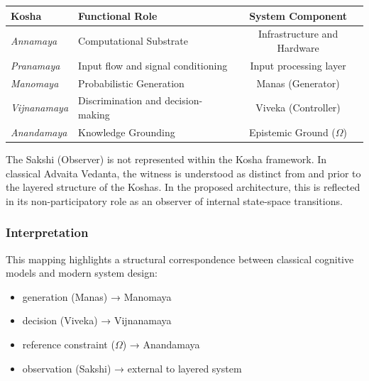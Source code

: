 \documentclass[12pt,a4paper]{article}
\begin{document}
\begin{table}[H] 
\centering
\renewcommand{\arraystretch}{0.9} 
\begin{tabularx}{\textwidth}{
|>{\centering\arraybackslash}m{3.5cm}
|>{\centering\arraybackslash}m{3.5cm}
|C|
}
\hline
\textbf{Kosha} & \textbf{Functional Role} & \textbf{System Component} \\ \hline

\textit{Annamaya}& 
Computational Substrate & 
Infrastructure and Hardware \\ \hline

\textit{Pranamaya}& 
Input flow and signal conditioning & 
Input processing layer \\ \hline

\textit{Manomaya} & Probabilistic Generation & Manas (Generator) \\ \hline

\textit{Vijnanamaya} & Discrimination and decision-making & Viveka (Controller) \\ \hline

\textit{Anandamaya} & 
Knowledge Grounding & 
Epistemic Ground ($\Omega$) \\ \hline

\end{tabularx}
\end{table}

The Sakshi (Observer) is not represented within the Kosha framework. In classical Advaita Vedanta, the witness is understood as distinct from and prior to the layered structure of the Koshas. In the proposed architecture, this is reflected in its non-participatory role as an observer of internal state-space transitions.

\subsubsection*{Interpretation}
This mapping highlights a structural correspondence between classical cognitive models and modern system design:

\begin{itemize}
\item generation (Manas) → Manomaya
\item decision (Viveka) → Vijnanamaya
\item reference constraint ($\Omega$) → Anandamaya
\item observation (Sakshi) → external to layered system
\end{itemize}
\end{document}
